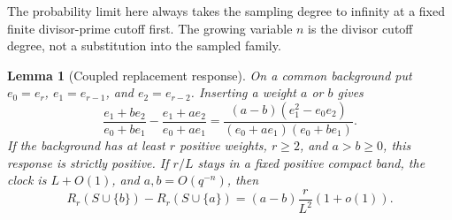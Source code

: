 \documentclass[11pt]{article}
\newtheorem{lemma}[theorem]{Lemma}
\begin{document}
The probability limit here always takes the sampling degree to infinity
at a fixed finite divisor-prime cutoff first. The growing variable \(n\)
is the divisor cutoff degree, not a substitution into the sampled family.

\begin{lemma}[Coupled replacement response]\label{lem:coupledResponse}
On a common background put \(e_0=e_r\), \(e_1=e_{r-1}\), and
\(e_2=e_{r-2}\). Inserting a weight \(a\) or \(b\) gives
\begin{equation}\label{eq:exactCoupledResponse}
 \frac{e_1+be_2}{e_0+be_1}
 -\frac{e_1+ae_2}{e_0+ae_1}
 =\frac{(a-b)(e_1^2-e_0e_2)}
 {(e_0+ae_1)(e_0+be_1)}.
\end{equation}
If the background has at least \(r\) positive weights, \(r\geq2\),
and \(a>b\geq0\), this response is strictly positive.
If \(r/L\) stays in a fixed positive compact band, the clock is
\(L+O(1)\), and \(a,b=O(q^{-n})\), then
\begin{equation}\label{eq:coupledAsymptotic}
 R_r(S\cup\{b\})-R_r(S\cup\{a\})
 =(a-b)\frac r{L^2}(1+o(1)).
\end{equation}
\end{lemma}
\end{document}
